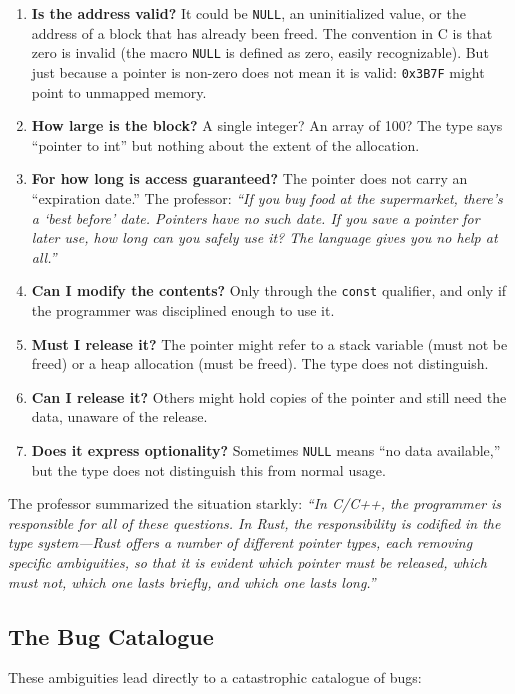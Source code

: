 \begin{enumerate}
    \item \textbf{Is the address valid?} It could be \texttt{NULL}, an uninitialized value, or the address of a block that has already been freed. The convention in C is that zero is invalid (the macro \texttt{NULL} is defined as zero, easily recognizable). But just because a pointer is non-zero does not mean it is valid: \texttt{0x3B7F} might point to unmapped memory.
    \item \textbf{How large is the block?} A single integer? An array of 100? The type says ``pointer to int'' but nothing about the extent of the allocation.
    \item \textbf{For how long is access guaranteed?} The pointer does not carry an ``expiration date.'' The professor: \emph{``If you buy food at the supermarket, there's a `best before' date. Pointers have no such date. If you save a pointer for later use, how long can you safely use it? The language gives you no help at all.''}
    \item \textbf{Can I modify the contents?} Only through the \texttt{const} qualifier, and only if the programmer was disciplined enough to use it.
    \item \textbf{Must I release it?} The pointer might refer to a stack variable (must not be freed) or a heap allocation (must be freed). The type does not distinguish.
    \item \textbf{Can I release it?} Others might hold copies of the pointer and still need the data, unaware of the release.
    \item \textbf{Does it express optionality?} Sometimes \texttt{NULL} means ``no data available,'' but the type does not distinguish this from normal usage.
\end{enumerate}

The professor summarized the situation starkly: \emph{``In C/C++, the programmer is responsible for all of these questions. In Rust, the responsibility is codified in the type system---Rust offers a number of different pointer types, each removing specific ambiguities, so that it is evident which pointer must be released, which must not, which one lasts briefly, and which one lasts long.''}

\subsection{The Bug Catalogue}

These ambiguities lead directly to a catastrophic catalogue of bugs:

